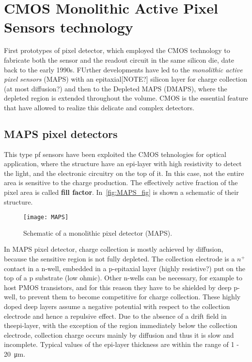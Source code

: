 \section{CMOS Monolithic Active Pixel Sensors technology} \label{sec:MAPS}
 
First prototypes of pixel detector, which employed the CMOS technology to fabricate both the sensor and the readout circuit in the same silicon die, date back to the early 1990s. FUrther developments have led to the \emph{monolithic active pixel sensors} (MAPS) with an epitaxial[NOTE?] silicon layer for charge collection (at most diffusion?) and then to the Depleted MAPS (DMAPS), where the depleted region is extended throughout the volume. CMOS is the essential feature that have allowed to realize this delicate and complex detectors.

\subsection{MAPS pixel detectors}

This type pf sensors have been exploited the CMOS tehnologies for optical application, where the structure have an epi-layer with high resistivity to detect the light, and the electronic circuitry on the top of it. In this case, not the entire area is sensitive to the charge production. The effectively active fraction of the pixel area is called \textbf{fill factor}. 
In~\autoref{fig:MAPS_fig} is shown a schematic of their structure. 

\begin{figure}[h!]
\centering
\texttt{[image: MAPS]}
\caption{Schematic of a monolithic pixel detector (MAPS).}
\label{fig:MAPS_fig}
\end{figure}

In MAPS pixel detector, charge collection is mostly achieved by diffusion, because the sensitive region is not fully depleted. The collection electrode is a $n^{+}$ contact in a n-well, embedded in a p-epitaxial layer (highly resistive?) put on the top of a p substrate (low ohmic). Other n-wells can be necessary, for example to host PMOS transistors, and for this reason they have to be shielded by deep p-well, to prevent them to become competitive for charge collection. These highly doped deep layers assume a negative potential with respect to the collection electrode and hence a repulsive effect.
Due to the absence of a drift field in theepi-layer, with the exception of the region immediately below the collection electrode, collection charge occurs mainly by diffusion and thus it is slow and incomplete. 
Typical values of the epi-layer thickness are within the range of 1 - \SI{20}{\micro m}.

